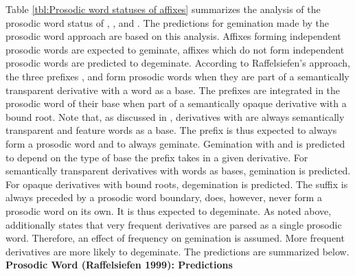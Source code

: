 Table \ref{tbl:Prosodic word statuses of affixes} summarizes the analysis of the prosodic word status of  , ,  and . The predictions for gemination made by the prosodic word approach are based on this analysis. Affixes forming independent prosodic words are expected to geminate, affixes which do not form independent prosodic words are predicted to degeminate.
According to Raffelsiefen's approach, the three prefixes ,  and  form prosodic words when they are part of a semantically transparent derivative with a word as a base. The prefixes are integrated in the prosodic word of their base when part of a semantically opaque derivative with a bound root. 
Note that, as discussed in , derivatives with  are always semantically transparent and feature words as a base. The prefix  is thus expected to always form a prosodic word and to always geminate. 
Gemination with  and  is predicted to depend on the type of base the prefix takes in a given derivative. For semantically transparent derivatives with words as bases, gemination is predicted. For opaque derivatives with bound roots, degemination is predicted.
The suffix  is always preceded by a prosodic word boundary, does, however, never form a prosodic word on its own. It is thus expected to degeminate. 
As noted above, \cite{Raffelsiefen.1999} additionally states that very frequent derivatives are parsed as a single prosodic word. Therefore, an effect of frequency on gemination is assumed. More frequent derivatives are more likely to degeminate. The predictions are summarized below.\\



\textbf{Prosodic Word (Raffelsiefen 1999): Predictions}

